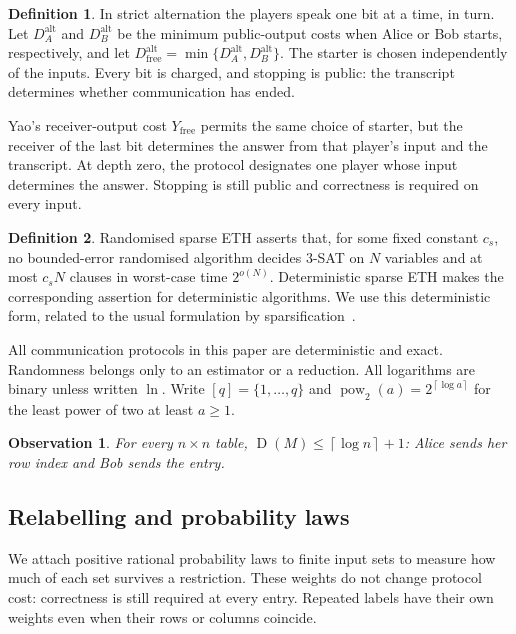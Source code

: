 \documentclass[11pt]{article} \usepackage[utf8]{inputenc}
\theoremstyle{plain} \newtheorem{theorem}{Theorem}[section]
\newtheorem{observation}[observation]{Observation}
\theoremstyle{definition} \newaliascnt{definition}{theorem}
\newtheorem{definition}[definition]{Definition} \aliascntresetthe{definition}
\newcommand{\D}{\operatorname{D}}
\newcommand{\ceil}[1]{\left\lceil#1\right\rceil}
\begin{document}
\begin{definition}\label{yao:model}
In strict alternation the players speak one bit at a time, in turn.
Let $D_A^{\mathrm{alt}}$ and $D_B^{\mathrm{alt}}$ be the minimum
public-output costs when Alice or Bob starts, respectively, and let
$D_{\mathrm{free}}^{\mathrm{alt}}=\min\{D_A^{\mathrm{alt}},D_B^{\mathrm{alt}}\}$.
The starter is chosen independently of the inputs. Every bit is charged,
and stopping is public: the transcript determines whether communication
has ended.

Yao's receiver-output cost $Y_{\mathrm{free}}$ permits the same choice of
starter, but the receiver of the last bit determines the answer from
that player's input and the transcript. At depth zero, the protocol
designates one player whose input determines the answer. Stopping is
still public and correctness is required on every input.
\end{definition}

\begin{definition}\label{def:reth}
Randomised sparse ETH asserts that, for some fixed constant $c_s$, no
bounded-error randomised algorithm decides $3$-SAT on $N$ variables and
at most $c_sN$ clauses in worst-case time $2^{o(N)}$. Deterministic sparse
ETH makes the corresponding assertion for deterministic algorithms.
We use this deterministic form, related to the usual formulation by
sparsification~\cite{impagliazzo2001ksat,impagliazzo2001strongly}.
\end{definition}

All communication protocols in this paper are deterministic and exact.
Randomness belongs only to an estimator or a reduction. All logarithms
are binary unless written $\ln$. Write $[q]=\{1,\ldots,q\}$ and
$\operatorname{pow}_2(a)=2^{\ceil{\log a}}$ for the least power of two
at least $a\ge1$.

\begin{observation}\label{obs:row-index-upper}
For every $n\times n$ table, $\D(M)\le\ceil{\log n}+1$: Alice sends
her row index and Bob sends the entry.
\end{observation}

\subsection{Relabelling and probability laws}

We attach positive rational probability laws to finite input sets to
measure how much of each set survives a restriction. These weights do
not change protocol cost: correctness is still required at every entry.
Repeated labels have their own weights even when their rows or columns
coincide.
\end{document}
